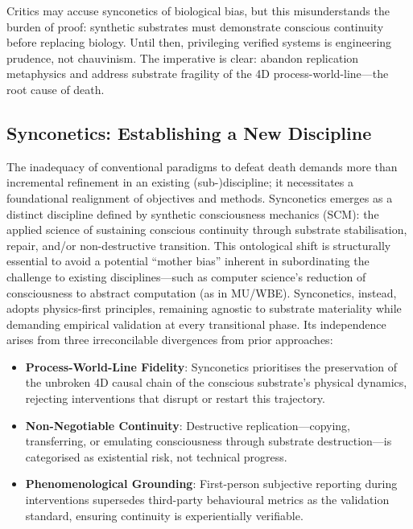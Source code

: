 \documentclass[10pt]{article}
\begin{document}
\begin{sloppypar}
  Critics may accuse synconetics of biological bias, but this misunderstands the burden of proof: synthetic substrates must demonstrate conscious continuity before replacing biology. Until then, privileging verified systems is engineering prudence, not chauvinism. The imperative is clear: abandon replication metaphysics and address substrate fragility of the 4D process-world-line—the root cause of death.

  \subsection{Synconetics: Establishing a New Discipline}
  \label{sec:new-discipline}


  The inadequacy of conventional paradigms to defeat death demands more than incremental refinement in an existing (sub-)discipline; it necessitates a foundational realignment of objectives and methods. Synconetics emerges as a distinct discipline defined by synthetic consciousness mechanics (SCM): the applied science of sustaining conscious continuity through substrate stabilisation, repair, and/or non-destructive transition. This ontological shift is structurally essential to avoid a potential “mother bias” inherent in subordinating the challenge to existing disciplines—such as computer science’s reduction of consciousness to abstract computation (as in MU/WBE). Synconetics, instead, adopts physics-first principles, remaining agnostic to substrate materiality while demanding empirical validation at every transitional phase. Its independence arises from three irreconcilable divergences from prior approaches:

  \begin{itemize}
    \item \textbf{Process-World-Line Fidelity}: Synconetics prioritises the preservation of the unbroken 4D causal chain of the conscious substrate’s physical dynamics, rejecting interventions that disrupt or restart this trajectory.
    \item \textbf{Non-Negotiable Continuity}: Destructive replication—copying, transferring, or emulating consciousness through substrate destruction—is categorised as existential risk, not technical progress.
    \item \textbf{Phenomenological Grounding}: First-person subjective reporting during interventions supersedes third-party behavioural metrics as the validation standard, ensuring continuity is experientially verifiable.
  \end{itemize}


\end{sloppypar}
\end{document}
